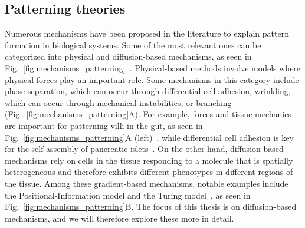 \subsection{Patterning theories}
Numerous mechanisms have been proposed in the literature to explain pattern formation in biological systems.
Some of the most relevant ones can be categorized into physical and diffusion-based mechanisms, as seen in Fig.~\ref{fig:mechanisms_patterning}~\parencite{hiscock2015mathematically, Scholes2017}.
Physical-based methods involve models where physical forces play an important role.
Some mechanisms in this category include phase separation, which can occur through differential cell adhesion, wrinkling, which can occur through mechanical instabilities, or branching (Fig.~\ref{fig:mechanisms_patterning}A).
For example, forces and tissue mechanics are important for patterning villi in the gut, as seen in Fig.~\ref{fig:mechanisms_patterning}A (left)~\parencite{shyer2013villification}, while differential cell adhesion is key for the self-assembly of pancreatic islets~\parencite{jia2007tissue}.
On the other hand, diffusion-based mechanisms rely on cells in the tissue responding to a molecule that is spatially heterogeneous and therefore exhibits different phenotypes in different regions of the tissue.
Among these gradient-based mechanisms, notable examples include the Positional-Information model and the Turing model~\parencite{Wolpert1969, Turing1952}, as seen in Fig.~\ref{fig:mechanisms_patterning}B.
The focus of this thesis is on diffusion-based mechanisms, and we will therefore explore these more in detail.


